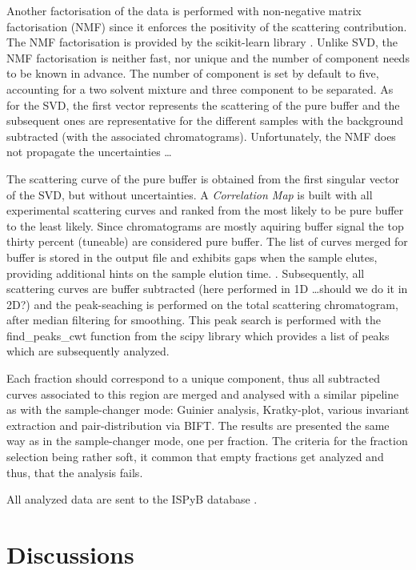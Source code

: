 \documentclass[preprint]{iucr}              %
\begin{document}
Another factorisation of the data is performed with non-negative matrix factorisation (NMF) since it enforces the positivity
of the scattering contribution. 
The NMF factorisation is provided by the scikit-learn library \cite{sklearn}.
Unlike SVD, the NMF factorisation is neither fast, nor unique and the number of component needs to be known in advance.
The number of component is set by default to five, accounting for a two solvent mixture and three component to be separated.   
As for the SVD, the first vector represents the scattering of the pure buffer and the subsequent ones 
are representative for the different samples with the background subtracted (with the associated chromatograms).
Unfortunately, the NMF does not propagate the uncertainties \ldots

The scattering curve of the pure buffer is obtained from the first singular vector of the SVD, but without uncertainties.
A \textit{Correlation Map} is built with all experimental scattering curves and ranked from the  most likely to be pure buffer
to the least likely. 
Since chromatograms are mostly aquiring buffer signal the top thirty percent (tuneable) are considered pure buffer.
The list of curves merged for buffer is stored in the output file and exhibits gaps when the sample elutes, 
providing additional hints on the sample elution time. .    
Subsequently, all scattering curves are buffer subtracted (here performed in 1D \ldots should we do it in 2D?) and the
peak-seaching is performed on the total scattering chromatogram, after median filtering for smoothing.
This peak search is performed with the find\_peaks\_cwt function from the scipy library \cite{scipy} which provides a
list of peaks which are subsequently analyzed.

Each fraction should correspond to a unique component, thus all subtracted curves associated to this region are merged and analysed
with a similar pipeline as with the sample-changer mode: Guinier analysis, Kratky-plot, various invariant extraction and 
pair-distribution via BIFT. 
The results are presented the same way as in the sample-changer mode, one per fraction.
The criteria for the fraction selection being rather soft, it common that empty fractions get analyzed and thus, 
that the analysis fails. 

All analyzed data are sent to the ISPyB database \cite{ISPYBB}.     

\section{Discussions}
\end{document}
